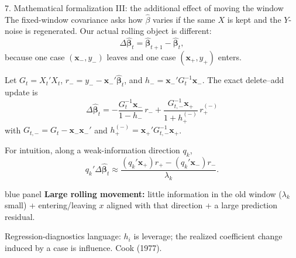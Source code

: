 \documentclass[aspectratio=169,10pt]{beamer}
\newenvironment{bluepanel}{\begin{beamercolorbox}[wd=\linewidth,sep=0.16cm,rounded=true]{blue panel}}{\end{beamercolorbox}}
\begin{document}
\begin{frame}{7. Mathematical formalization III: the additional effect of moving the window}
\scriptsize
The fixed-window covariance asks how $\hat\beta$ varies if the same $X$ is kept and the $Y$-noise is regenerated. Our actual rolling object is different:
\[
\boxed{\Delta\hat{\bm\beta}_t=\hat{\bm\beta}_{t+1}-\hat{\bm\beta}_t,}
\]
because one case $(\bm x_-,y_-)$ leaves and one case $(\bm x_+,y_+)$ enters.

Let $G_t=X_t'X_t$, $r_-=y_--\bm x_-'\hat{\bm\beta}_t$, and $h_-=\bm x_-'G_t^{-1}\bm x_-$. The exact delete--add update is
\[
\boxed{
\Delta\hat{\bm\beta}_t
=-\frac{G_t^{-1}\bm x_-}{1-h_-}\,r_-
+\frac{G_{t,-}^{-1}\bm x_+}{1+h_+^{(-)}}\,r_+^{(-)} }
\]
with $G_{t,-}=G_t-\bm x_-\bm x_-'$ and $h_+^{(-)}=\bm x_+'G_{t,-}^{-1}\bm x_+$.

For intuition, along a weak-information direction $q_k$,
\[
\boxed{
q_k'\Delta\hat{\bm\beta}_t
\approx
\frac{(q_k'\bm x_+)r_+-(q_k'\bm x_-)r_-}{\lambda_k}.}
\]

\begin{bluepanel}
\centering
\textbf{Large rolling movement:} little information in the old window ($\lambda_k$ small) + entering/leaving $x$ aligned with that direction + a large prediction residual.
\end{bluepanel}
\vspace{0.04cm}
{\color{textgray}\fontsize{5.2}{5.8}\selectfont Regression-diagnostics language: $h_i$ is leverage; the realized coefficient change induced by a case is influence. Cook (1977).}
\end{frame}
\end{document}
